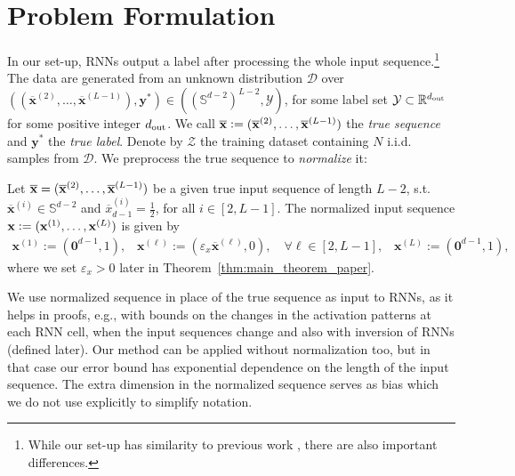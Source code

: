 \section{Problem Formulation}    
In our set-up, RNNs output a label after processing the whole input sequence.\footnote{While our set-up has similarity to previous work \cite{allen2019can}, there are also important differences.}
The data are generated from an unknown distribution $\mathcal{D}$ over $ ((\overline{\mathbf{x}}^{(2)}, \ldots, \overline{\mathbf{x}}^{(L-1)}), \mathbf{y}^{\ast}) \in ((\mathbb{S}^{d-2})^{L-2}, \mathcal{Y})$, for some label set $\mathcal{Y} \subset \mathbb{R}^{d_{\mathrm{out}} }$ for some positive integer $d_{\mathrm{out}} $. 
We call $\overline{\mathbf{x}} := (\overline{\mathbf{x}}^{(2)}, \ldots, \overline{\mathbf{x}}^{(L-1)})$ the \emph{true sequence} and $\mathbf{y}^{\ast}$ the \emph{true label}. Denote by $\mathcal{Z}$ the training dataset containing $N$ i.i.d. samples from $\mathcal{D}$. We preprocess the true sequence to \emph{normalize} it:
\begin{definition}\label{def:normalized_seq}
	Let $\overline{\mathbf{x}} = (\overline{\mathbf{x}}^{(2)}, \ldots, \overline{\mathbf{x}}^{(L-1)})$ be a given true input sequence of length $L-2$, s.t. $\overline{\mathbf{x}}^{(i)} \in  \mathbb{S}^{d-2}$ and $\overline{x}^{(i)}_{d-1} = \frac{1}{2}$, for all $i \in [2, L-1]$. 
	The normalized input sequence $\mathbf{x} := (\mathbf{x}^{(1)}, \ldots, \mathbf{x}^{(L)})$ is given by
	\begin{align*}
		\mathbf{x}^{(1)} := (\mathbf{0}^{d-1}, 1), \;\;\;
		\mathbf{x}^{(\ell)} := (\varepsilon_x \overline{\mathbf{x}}^{(\ell)}, 0), \quad \forall \ell \in [2, L-1], \;\;\;
		\mathbf{x}^{(L)} := (\mathbf{0}^{d-1}, 1), 
	\end{align*}
	where we set $\varepsilon_x > 0$ later in Theorem~\ref{thm:main_theorem_paper}. %
\end{definition}	
	We use normalized sequence in place of the true sequence as input to RNNs, as it helps in proofs, e.g., with bounds on the changes in the activation patterns at each RNN cell, when the input sequences change and also with inversion of RNNs (defined later). Our method can be applied without normalization too, but in that case our error bound has exponential dependence on the length of the input sequence. The extra dimension in the normalized sequence serves as bias which we do not use explicitly to simplify notation. 	
